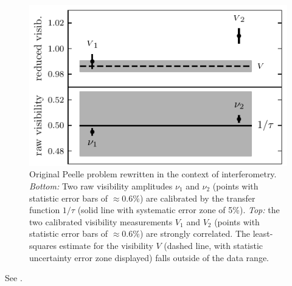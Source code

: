 \documentclass[twocolumn]{article}
\def\data{\ensuremath{{\scriptstyle V}}}
\begin{document}
\begin{figure}[t]
\includegraphics[width=\linewidth]{pdf/original-peelle.pdf}
\caption{Original Peelle problem rewritten in the context of interferometry.  \emph{Bottom:} Two raw visibility amplitudes $\nu_1$ and $\nu_2$ (points with statistic error bars of $\approx 0.6\%$) are calibrated by the transfer function $1/\tau$ (solid line with systematic error zone of 5\%). \emph{Top:} the two calibrated visibility measurements $\data_1$ and $\data_2$ (points with statistic error bars of $\approx 0.6\%$) are strongly correlated. The least-squares estimate for the visibility $\data$ (dashed line, with statistic uncertainty error zone displayed) falls outside of the data range.}
\label{fig:peelle}
\end{figure}

See \cite{PEE87,DAG94,BUR11,NEU12,NEU13,NEU14,NIS14}.
\end{document}
